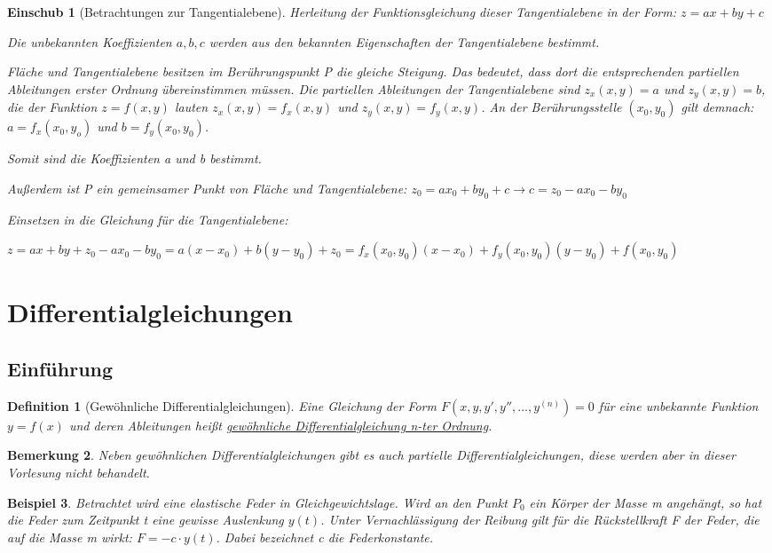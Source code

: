 \documentclass[fontset=ubuntu,11pt,a4paper,fleqn,headsepline]{scrreprt}
\newtheorem{defi}{Definition}[section]
\newtheorem{bemerkung}[defi]{Bemerkung}
\newtheorem{beispiel}[defi]{Beispiel}
\newtheorem*{einschub}{Einschub}
\begin{document}
\begin{multicols}{2}
\begin{einschub}[Betrachtungen zur Tangentialebene]
            Herleitung der Funktionsgleichung dieser Tangentialebene in der Form: \(z=ax+by+c\)
    
            Die unbekannten Koeffizienten \(a,b,c\) werden aus den bekannten Eigenschaften der Tangentialebene bestimmt.
    
            Fläche und Tangentialebene besitzen im Berührungspunkt P die gleiche Steigung. Das bedeutet, dass dort die entsprechenden partiellen Ableitungen erster Ordnung über\-ein\-stimmen müssen. Die partiellen Ableitungen der Tangentialebene sind \(z_x(x,y)=a\) und \(z_y(x,y)=b\), die der Funktion \(z=f(x,y)\) lauten \(z_x(x,y)=f_x(x,y)\) und \(z_y(x,y)=f_y(x,y)\). An der Berührungsstelle \((x_0,y_0)\) gilt demnach: \(a=f_x(x_0,y_o)\) und \(b=f_y(x_0,y_0)\).
    
            Somit sind die Koeffizienten a und b bestimmt.
    
            Außerdem ist P ein gemeinsamer Punkt von Fläche und Tangentialebene: \(z_0=ax_0+by_0+c \to c=z_0-ax_0-by_0\)
    
            Einsetzen in die Gleichung für die Tangentialebene:
    
            \(z=ax+by+z_0-ax_0-by_0 = a(x-x_0)+b(y-y_0)+z_0=f_x(x_0,y_0)(x-x_0)+f_y(x_0,y_0)(y-y_0)+f(x_0,y_0)\)
        \end{einschub}
    
        \chapter*{Differentialgleichungen}
        \section*{Einführung}
    
        \begin{defi}[Gewöhnliche Differentialgleichungen]
            Eine Gleichung der Form \(F(x,y,y',y'',\dots,y^{(n)})=0\) für eine unbekannte Funktion \(y=f(x)\) und deren Ableitungen heißt \underline{gewöhnliche Differentialgleichung n-ter Ordnung}.
        \end{defi}
    
        \begin{bemerkung}
            Neben gewöhnlichen Differentialgleichungen gibt es auch partielle Differentialgleichungen, diese werden aber in dieser Vorlesung nicht behandelt.
        \end{bemerkung}
    
        \begin{beispiel}
            Betrachtet wird eine elastische Feder in Gleichgewichtslage. Wird an den Punkt \(P_0\) ein Körper der Masse m angehängt, so hat die Feder zum Zeitpunkt t eine gewisse Auslenkung \(y(t)\). Unter Vernachlässigung der Reibung gilt für die Rückstellkraft F der Feder, die auf die Masse m wirkt: \(F=-c \cdot y(t)\). Dabei bezeichnet c die Federkonstante.
    

\end{beispiel}
\end{multicols}
\end{document}
